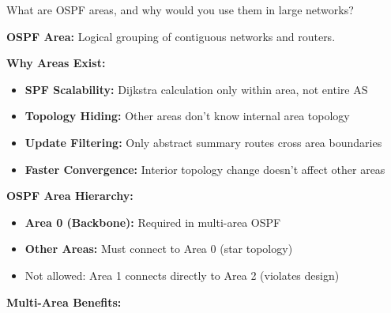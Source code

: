 \documentclass[12pt,a4paper]{article}
\begin{document}

\begin{qbox}{What are OSPF areas, and why would you use them in large networks?}
\end{qbox}

\begin{abox}
\textbf{OSPF Area:} Logical grouping of contiguous networks and routers.

\textbf{Why Areas Exist:}
\begin{itemize}
    \item \textbf{SPF Scalability:} Dijkstra calculation only within area, not entire AS
    \item \textbf{Topology Hiding:} Other areas don't know internal area topology
    \item \textbf{Update Filtering:} Only abstract summary routes cross area boundaries
    \item \textbf{Faster Convergence:} Interior topology change doesn't affect other areas
\end{itemize}

\textbf{OSPF Area Hierarchy:}
\begin{itemize}
    \item \textbf{Area 0 (Backbone):} Required in multi-area OSPF
    \item \textbf{Other Areas:} Must connect to Area 0 (star topology)
    \item Not allowed: Area 1 connects directly to Area 2 (violates design)
\end{itemize}

\textbf{Multi-Area Benefits:}
\begin{center}
\end{center}
\end{abox}
\end{document}
